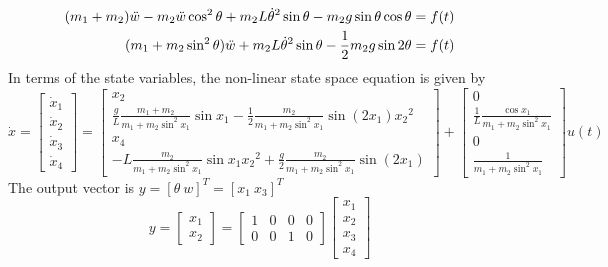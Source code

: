 \documentclass[12pt]{article}
\numberwithin{equation}{section}
\begin{document}
\begin{align}
    (m_1 + m_2) \Ddot{w} - m_2  \Ddot{w} \cos^2\theta + m_2 L \dot{\theta}^2 \sin\theta - m_2 g \sin\theta \cos\theta &= f(t)\\
    (m_1 + m_2 \sin^2\theta) \Ddot{w} + m_2 L \dot{\theta}^2 \sin\theta - \frac{1}{2} m_2 g \sin2\theta &= f(t)
\end{align}
In terms of the state variables, the non-linear state space equation is given by
\begin{equation}
    \dot{x}
    =
    \begin{bmatrix}
        \dot{x}_1\\
        \dot{x}_2\\
        \dot{x}_3\\
        \dot{x}_4
    \end{bmatrix}
    =
    \begin{bmatrix}
        x_2\\
        \frac{g}{L} \frac{m_1 + m_2}{m_1 + m_2 \sin^2 x_1} \sin x_1 - \frac{1}{2} \frac{m_2}{m_1 + m_2 \sin^2 x_1} \sin(2x_1) {x_2}^2\\
        x_4\\
        -L\frac{m_2}{m_1 + m_2 \sin^2 x_1} \sin x_1 {x_2}^2 + \frac{g}{2} \frac{m_2}{m_1 + m_2 \sin^2 x_1} \sin(2 x_1)
    \end{bmatrix}
    +
    \begin{bmatrix}
        0\\
        \frac{1}{L} \frac{\cos x_1}{m_1 + m_2 \sin^2 x_1}\\
        0\\
        \frac{1}{m_1 + m_2 \sin^2 x_1}
    \end{bmatrix}
    u(t)
\end{equation}
The output vector is $y = \left[\theta \ w \right]^T = \left[x_1 \ x_3 \right]^T$
\begin{equation}
    y
    =
    \begin{bmatrix}
        x_1\\
        x_2
    \end{bmatrix}
    =
    \begin{bmatrix}
        1 & 0 & 0 & 0\\
        0 & 0 & 1 & 0
    \end{bmatrix}
    \begin{bmatrix}
        x_1\\
        x_2\\
        x_3\\
        x_4
    \end{bmatrix}
\end{equation}
\end{document}
